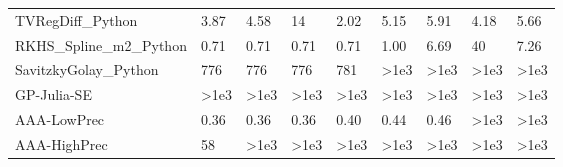 \begin{table}
\begin{tabular}{lllllllll}
TVRegDiff_Python & 3.87 & 4.58 & 14 & 2.02 & 5.15 & 5.91 & 4.18 & 5.66 \\
RKHS_Spline_m2_Python & 0.71 & 0.71 & 0.71 & 0.71 & 1.00 & 6.69 & 40 & 7.26 \\
SavitzkyGolay_Python & 776 & 776 & 776 & 781 & >1e3 & >1e3 & >1e3 & >1e3 \\
GP-Julia-SE & >1e3 & >1e3 & >1e3 & >1e3 & >1e3 & >1e3 & >1e3 & >1e3 \\
AAA-LowPrec & 0.36 & 0.36 & 0.36 & 0.40 & 0.44 & 0.46 & >1e3 & >1e3 \\
AAA-HighPrec & 58 & >1e3 & >1e3 & >1e3 & >1e3 & >1e3 & >1e3 & >1e3 \\
\bottomrule
\end{tabular}
\end{table}
